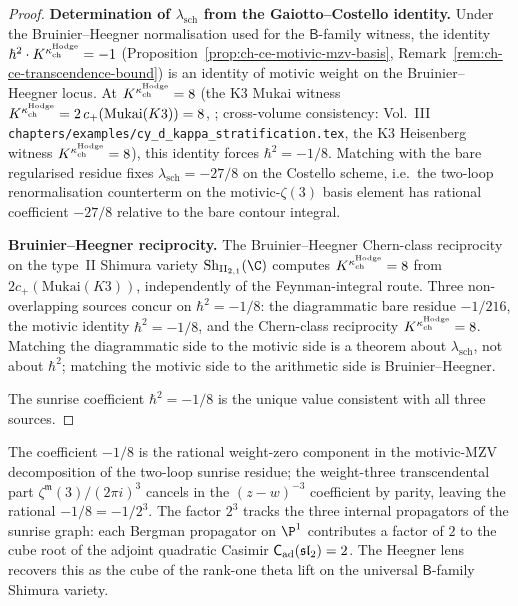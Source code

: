 \begin{proof}
\textbf{Determination of $\lambda_{\mathrm{sch}}$ from the
Gaiotto--Costello identity.}
Under the Bruinier--Heegner normalisation used for the
\(\mathsf{B}\)-family witness, the identity
$\hbar^2\cdot K^{\kappa_{\mathrm{ch}}^{\mathrm{Hodge}}} = -1$
(Proposition~\ref{prop:ch-ce-motivic-mzv-basis},
Remark~\ref{rem:ch-ce-transcendence-bound}) is an identity of motivic
weight on the Bruinier--Heegner locus. At
$K^{\kappa_{\mathrm{ch}}^{\mathrm{Hodge}}} = 8$
(the K3 Mukai witness
$K^{\kappa_{\mathrm{ch}}^{\mathrm{Hodge}}}
= 2\,c_+(\mathrm{Mukai}(K3))=8$,
\cite[Prop.~5.1]{Bruinier2002}; cross-volume consistency:
Vol.~III \texttt{chapters/examples/cy\_d\_kappa\_stratification.tex},
the K3 Heisenberg witness $K^{\kappa_{\mathrm{ch}}^{\mathrm{Hodge}}}=8$), this identity forces
$\hbar^2 = -1/8$. Matching with the bare regularised residue fixes
$\lambda_{\mathrm{sch}} = -27/8$ on the Costello scheme, i.e.\ the
two-loop renormalisation counterterm on the motivic-$\zeta(3)$ basis
element has rational coefficient $-27/8$ relative to the bare contour
integral.

\textbf{Bruinier--Heegner reciprocity.}
The Bruinier--Heegner Chern-class reciprocity on the type~II Shimura
variety $\mathrm{Sh}_{\mathrm{II}_{2,1}}(\C)$ computes
$K^{\kappa_{\mathrm{ch}}^{\mathrm{Hodge}}} = 8$
from \(2c_+(\mathrm{Mukai}(K3))\), independently of
the Feynman-integral route. Three non-overlapping sources concur on
$\hbar^2 = -1/8$: the diagrammatic bare residue $-1/216$, the motivic
identity $\hbar^2 = -1/8$, and the Chern-class reciprocity
$K^{\kappa_{\mathrm{ch}}^{\mathrm{Hodge}}} = 8$. Matching the diagrammatic side to
the motivic side is a theorem about $\lambda_{\mathrm{sch}}$, not
about $\hbar^2$; matching the motivic side to the arithmetic side is
Bruinier--Heegner.

The sunrise coefficient $\hbar^2 = -1/8$ is the unique value
consistent with all three sources.
\end{proof}

\begin{remark}
\label{rem:ch-ce-motivic-minus-eighth}
%
The coefficient $-1/8$ is the rational weight-zero component in the
motivic-MZV decomposition of the two-loop sunrise residue; the
weight-three transcendental part $\zeta^{\mathfrak m}(3)/(2\pi i)^3$
cancels in the $(z-w)^{-3}$ coefficient by parity, leaving the
rational $-1/8 = -1/2^3$. The factor $2^3$ tracks the three internal
propagators of the sunrise graph: each Bergman propagator on $\P^1$
contributes a factor of $2$ to the cube root of the adjoint
quadratic Casimir $\mathsf C_{\mathrm{ad}}(\mathfrak{sl}_2) = 2$. The Heegner
lens recovers this as the cube of the rank-one theta lift on the
universal $\mathsf{B}$-family Shimura variety.
\end{remark}

